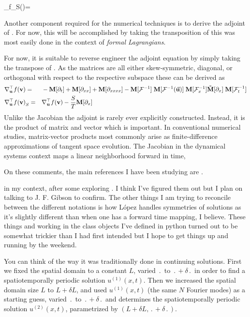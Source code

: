 \beq\label{e-fksjacobianS}
\nabla_{}f_S(\statev)=\:
\eeq

Another component required for the numerical techniques is to derive the adjoint of . For now,
this will be accomplished by taking the transposition of  this was
most easily done in the context of \textit{formal Lagrangians}.

For now, it is suitable to reverse engineer the adjoint equation by simply taking the transpose of .
As the matrices are all either skew-symmetric, diagonal, or orthogonal with respect to the respective subspace
these can be derived as
\begin{alignat}{2}\label{e-fksjacobianadjoint}
&\nabla_{\mathbf{u}}^{\top}f{(\mathbf{v})}=&& -\mathbf{M}[{\partial_{t}}]+\mathbf{M}[{\partial_{xx}}]+\mathbf{M}[{\partial_{xxxx}}]
-\mathbf{M}[{\mathcal{F}^{-1}}]\;\mathbf{M}[{\mathcal{F}^{-1}(\vec{\mathbf{u}})}]\;\mathbf{M}[{\mathcal{F}^{-1}_x}]\mathbf{\tilde{M}}[\partial_{x}]\;\mathbf{M}[{\mathcal{F}^{-1}_t}] \nonumber \\ 
&\nabla_{\mathbf{u}}^{\top}f{(\mathbf{v})}_S=&&\nabla_{\mathbf{u}}^{\top}f{(\mathbf{v})}-\frac{S}{T}\mathbf{M}[{\partial_{x}}]
\end{alignat}
Unlike the Jacobian  the adjoint is rarely ever explicitly constructed. Instead, it is the product
of matrix and vector which is important. In conventional numerical studies, matrix-vector products most commonly arise as
finite-difference approximations of tangent space evolution. The Jacobian in the dynamical systems context maps a linear neighborhood
forward in time,

On these comments, the main references I have been studying are
.

in my context, after some exploring .
I think I've figured them out but I plan on talking to J. F. Gibson to confirm.
The other things I am trying to reconcile between the different notations is
how L{\'o}pez \etal{} handles symmetries of solutions as it's slightly different
than when one has a forward time mapping, I believe. These things and working in
the class objects I've defined in python turned out to be somewhat trickier
than I had first intended but I hope to get things up and running by the
weekend.

You can think of the way it was traditionally done in continuing solutions.
First we fixed the spatial domain to a constant $L$, varied $\period{}$ to
$\period{}+\delta\period{}$ in order to find a spatiotemporally periodic
solution $u^{(1)}(x,t)$. Then we increased the spatial domain size $L$ to
$L+\delta L$, and used $u^{(1)}(x,t)$ (the same $N$ Fourier modes) as a
starting guess, varied $\period{}$ to $\period{}+\delta\period{}$ and
determines the spatiotemporally periodic solution $u^{(2)}(x,t)$,
parametrized by $(L+\delta L,\period{}+\delta\period{})$.


